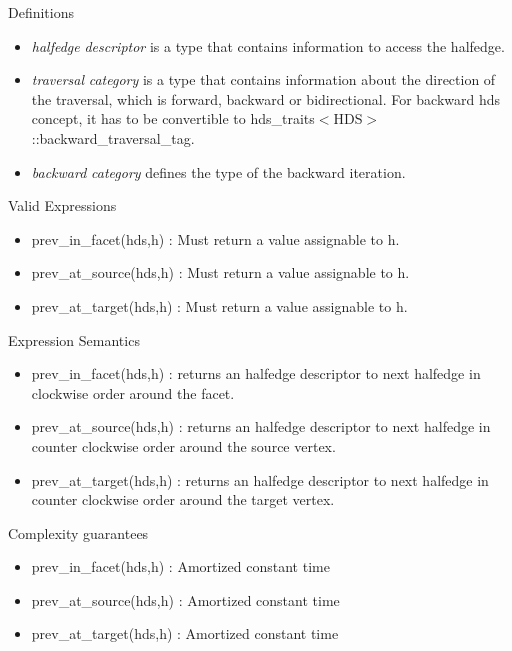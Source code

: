 \begin{Desc}
\item[Definitions]\begin{itemize}
\item {\em halfedge\/} {\em descriptor\/} is a type that contains information to access the halfedge.\item {\em traversal\/} {\em category\/} is a type that contains information about the direction of the traversal, which is forward, backward or bidirectional. For backward hds concept, it has to be convertible to hds\_\-traits$<$HDS$>$::backward\_\-traversal\_\-tag.\item {\em backward\/} {\em category\/} defines the type of the backward iteration.\end{itemize}
\end{Desc}
\begin{Desc}
\item[Valid Expressions]\begin{itemize}
\item prev\_\-in\_\-facet(hds,h) : Must return a value assignable to h.\item prev\_\-at\_\-source(hds,h) : Must return a value assignable to h.\item prev\_\-at\_\-target(hds,h) : Must return a value assignable to h.\end{itemize}
\end{Desc}
\begin{Desc}
\item[Expression Semantics]\begin{itemize}
\item prev\_\-in\_\-facet(hds,h) : returns an halfedge descriptor to next halfedge in clockwise order around the facet.\item prev\_\-at\_\-source(hds,h) : returns an halfedge descriptor to next halfedge in counter clockwise order around the source vertex.\item prev\_\-at\_\-target(hds,h) : returns an halfedge descriptor to next halfedge in counter clockwise order around the target vertex.\end{itemize}
\end{Desc}
\begin{Desc}
\item[Complexity guarantees]\begin{itemize}
\item prev\_\-in\_\-facet(hds,h) : Amortized constant time\item prev\_\-at\_\-source(hds,h) : Amortized constant time\item prev\_\-at\_\-target(hds,h) : Amortized constant time\end{itemize}
\end{Desc}
